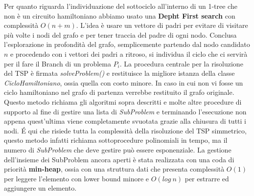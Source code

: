 \documentclass[
	article,			%
	12pt,				%
	oneside,			%
	a4paper,			%
	english,			%
	italian,				%
	sumario=tradicional,
	]{abntex2}
\begin{document}
\newline
\newline
Per quanto riguarda l'individuazione del sottociclo all'interno di un 1-tree che non è un circuito hamiltoniano abbiamo usato una \textbf{Depht First search} con complessità $O(n+m)$. L'idea è usare un vettore di padri per evitare di visitare più volte i nodi del grafo e per tener traccia del padre di ogni nodo. Conclusa l'esplorazione in profondità del grafo, semplicemente partendo dal nodo candidato $n$ e procedendo con i vettori dei padri a ritroso, si individua il ciclo che ci servirà per il fare il Branch di un problema $P_i$.
\newline
\newline
La procedura centrale per la risoluzione del TSP è firmata \textit{solveProblem()} e restituisce la migliore istanza della classe \textit{CicloHamiltoniano}, ossia quella con costo minore. In caso in cui non vi fosse un ciclo hamiltoniano nel grafo di partenza verrebbe restituito il grafo originale. Questo metodo richiama gli algoritmi sopra descritti e molte altre procedure di supporto al fine di gestire una lista di \textit{SubProblem} e terminando l'esecuzione non appena quest'ultima viene completamente svuotata grazie alla chiusura di tutti i nodi. \'E qui che risiede tutta la complessità della risoluzione del TSP simmetrico, questo metodo infatti richiama sottoprocedure polinomiali in tempo, ma il numero di \textit{SubProblem} che deve gestire può essere esponenziale.
\newline
La gestione dell'insieme dei SubProblem ancora aperti è stata realizzata con una coda di priorità \textbf{min-heap}, ossia con una struttura dati che presenta complessità $O(1)$ per leggere l'elemento con lower bound minore e $O(log\:n)$ per estrarre ed aggiungere un elemento.
\end{document}
